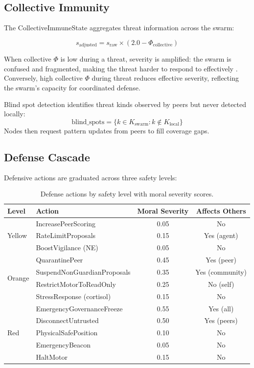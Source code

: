 \documentclass[11pt,a4paper]{article}
\begin{document}
\subsection{Collective Immunity}

The CollectiveImmuneState aggregates threat information across the swarm:

\begin{equation}
s_{\text{adjusted}} = s_{\text{raw}} \times (2.0 - \Phi_{\text{collective}})
\end{equation}

When collective $\Phi$ is low during a threat, severity is amplified: the swarm is confused and fragmented, making the threat harder to respond to effectively \citep{woolley2010}. Conversely, high collective $\Phi$ during threat reduces effective severity, reflecting the swarm's capacity for coordinated defense.

Blind spot detection identifies threat kinds observed by peers but never detected locally:
\begin{equation}
\text{blind\_spots} = \{k \in K_{\text{swarm}} : k \notin K_{\text{local}}\}
\end{equation}
Nodes then request pattern updates from peers to fill coverage gaps.

\subsection{Defense Cascade}

Defensive actions are graduated across three safety levels:

\begin{table}[h]
\centering
\caption{Defense actions by safety level with moral severity scores.}
\label{tab:defense}
\begin{tabular}{llcc}
\toprule
\textbf{Level} & \textbf{Action} & \textbf{Moral Severity} & \textbf{Affects Others} \\
\midrule
\multirow{3}{*}{Yellow} & IncreasePeerScoring & 0.05 & No \\
 & RateLimitProposals & 0.15 & Yes (agent) \\
 & BoostVigilance (NE) & 0.05 & No \\
\midrule
\multirow{4}{*}{Orange} & QuarantinePeer & 0.45 & Yes (peer) \\
 & SuspendNonGuardianProposals & 0.35 & Yes (community) \\
 & RestrictMotorToReadOnly & 0.25 & No (self) \\
 & StressResponse (cortisol) & 0.15 & No \\
\midrule
\multirow{5}{*}{Red} & EmergencyGovernanceFreeze & 0.55 & Yes (all) \\
 & DisconnectUntrusted & 0.50 & Yes (peers) \\
 & PhysicalSafePosition & 0.10 & No \\
 & EmergencyBeacon & 0.05 & No \\
 & HaltMotor & 0.15 & No \\
\bottomrule
\end{tabular}
\end{table}
\end{document}
